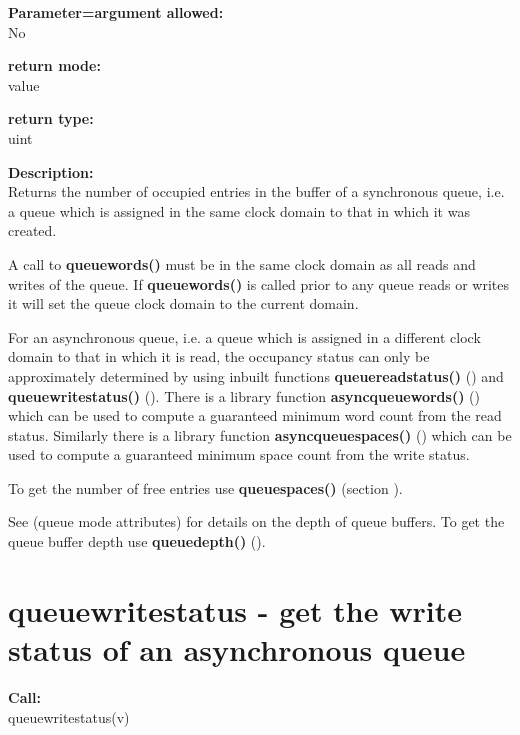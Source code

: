        {\bf Parameter=argument allowed:} \\
        No
        
        {\bf return mode:} \\
        value

        {\bf return type:} \\
        uint
        
        {\bf Description:} \\
        Returns the number of occupied entries in the buffer of a synchronous
        queue, i.e. a queue which is assigned in the same clock domain to that in
        which it was created.

        A call to {\bf queuewords()} must be in the same clock domain as all
        reads and writes of the queue. If {\bf queuewords()} is called prior to
        any queue reads or writes it will set the queue clock domain to the
        current domain.

        For an asynchronous queue, i.e. a queue which is assigned in a different
        clock domain to that in which it is read, the occupancy status can only
        be approximately determined by using inbuilt functions {\bf
        queuereadstatus()} () and {\bf
        queuewritestatus()} ().
        There is a library function {\bf asyncqueuewords()}
        () which can be used to compute
        a guaranteed minimum word count from the read status.
        Similarly there is a library function {\bf asyncqueuespaces()}
        () which can be used to compute
        a guaranteed minimum space count from the write status.

        To get the number of free entries use {\bf queuespaces()} (section
        ).
        
        See  (queue mode attributes) for details on the
        depth of queue buffers. To get the queue buffer depth use {\bf
        queuedepth()} ().
   

    \section{queuewritestatus - get the write status of an asynchronous
                                                queue}\label{sec:ifqueuewritestatus}
        
        {\bf Call:} \\
        queuewritestatus(v)
        

